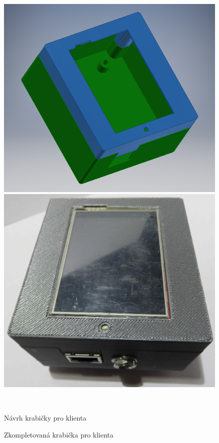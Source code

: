 \begin{figure}[hbtp]
\centering
\begin{minipage}[c]{\textwidth/2-1cm}
\includegraphics[width=\textwidth]{img/foto/client_navrh.png}
\end{minipage}
\begin{minipage}[c]{\textwidth/2-1cm}
\includegraphics[width=\textwidth]{img/foto/client_realizace.jpg}
\end{minipage}
\\
\begin{minipage}[c]{\textwidth/2-0.5cm}
\caption{\label{fig:client_navrh}Návrh krabičky pro klienta}
\end{minipage}
\begin{minipage}[c]{\textwidth/2-.5cm}
\caption{\label{fig:client_realizace}Zkompletovaná krabička pro klienta}
\end{minipage}
\end{figure}

